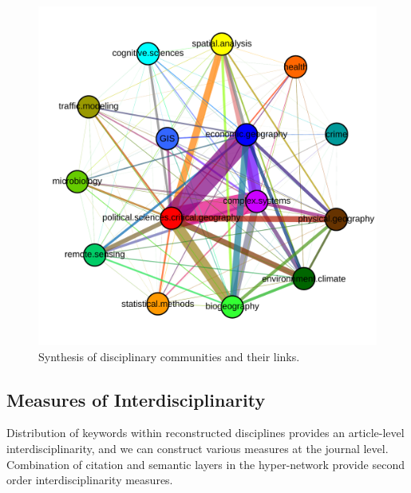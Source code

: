 \begin{figure}
\centering
\includegraphics[width=\textwidth]{figures/synththemcyb}
\caption{Synthesis of disciplinary communities and their links.}
\label{fig:comsynthesis}
\end{figure}




\subsection{Measures of Interdisciplinarity}





Distribution of keywords within reconstructed disciplines provides an article-level interdisciplinarity, and we can construct various measures at the journal level. Combination of citation and semantic layers in the hyper-network provide second order interdisciplinarity measures.



